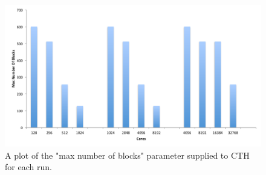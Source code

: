 \begin{figure}[htb]
  \centering
  \includegraphics[width=\linewidth]{figures/MaxNumberOfBlocks.pdf}
  \caption{A plot of the "max number of blocks" parameter supplied to CTH for each run.}
  \label{fig:MaxBlocks}
\end{figure}


